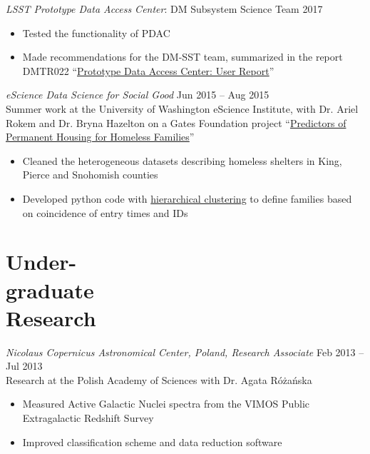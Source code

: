 \documentclass[margin]{res}
\begin{document}
\begin{resume}
{\sl LSST Prototype Data Access Center}: DM Subsystem Science Team \hfill            2017
\begin{itemize}  \itemsep -2pt 
\item Tested the functionality of PDAC
\item Made recommendations for the DM-SST team, summarized in the report DMTR022 ``\href{https://ls.st/DMTR-22}{Prototype Data Access Center: User Report}'' 
\end{itemize}

{\sl eScience Data Science for Social Good} \hfill Jun 2015 -- Aug 2015\\
 Summer work at the University of Washington eScience Institute, with Dr. Ariel Rokem and Dr. Bryna Hazelton  on a Gates Foundation project ``\href{https://escience.washington.edu/get-involved/data-science-for-social-good/dssg-project-summaries-15}{Predictors of Permanent Housing for Homeless Families}''
\begin{itemize}  \itemsep -1pt 
\item Cleaned the heterogeneous datasets describing homeless shelters in King, Pierce and Snohomish counties
\item Developed python code with \href{https://uwescience.github.io/DSSG2015-predicting-permanent-housing/2015-07-27-chris-galaxy-clusters/}{hierarchical clustering}  to define families based on coincidence of entry times and IDs
\end{itemize}


\section{Under-\\graduate\\Research} 

{\sl Nicolaus Copernicus Astronomical Center, Poland, Research Associate} \hfill Feb 2013 -- Jul 2013 \\ Research at the Polish Academy of Sciences  with Dr. Agata R\'{o}\.{z}a\'{n}ska
\begin{itemize}
	\item Measured Active Galactic Nuclei spectra from the VIMOS Public Extragalactic Redshift Survey
	\item Improved classification scheme and data reduction software
\end{itemize}


\end{resume}
\end{document}
